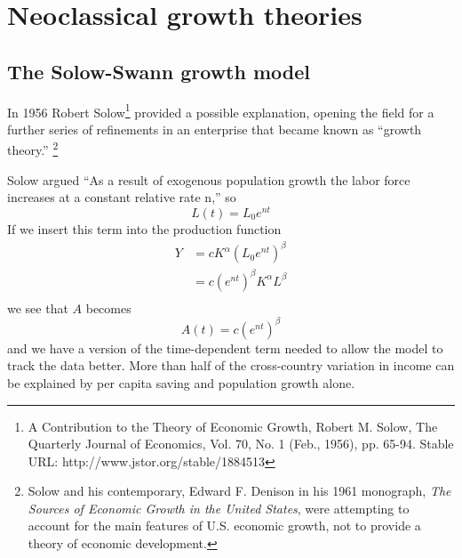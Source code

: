   \section{Neoclassical growth theories}  

 \subsection{The Solow-Swann growth model}
In 1956 Robert Solow\footnote{A Contribution to the Theory of Economic Growth,  Robert M. Solow, The Quarterly Journal of Economics, Vol. 70, No. 1 (Feb., 1956), pp. 65-94. Stable URL: http://www.jstor.org/stable/1884513} provided a possible explanation, opening the field for a further series of refinements in an enterprise that became known as ``growth theory.''
\footnote{Solow and his contemporary, Edward F. Denison in his 1961 monograph, \textit{The Sources of Economic Growth in the United States}, were attempting to account for the main features of U.S. economic growth, not to provide a theory of economic development.}%

Solow argued ``As a result of exogenous population growth the labor force increases at a constant relative rate n,'' so
  \[L(t)= L_0e^{nt}\] 
If we insert this term into the production function 
 \begin{eqnarray}
 Y&=cK^\alpha (L_0e^{nt})^\beta\\
    &=c(e^{nt})^{\beta}K^\alpha L^\beta\\
 \end{eqnarray}
we see that $A$ becomes
 \[A(t)=c(e^{nt})^\beta\]
and we have a version of the time-dependent term needed to  allow the model to track the data better. More than half  of the cross-country variation in income can be explained by per capita saving and population growth alone.





